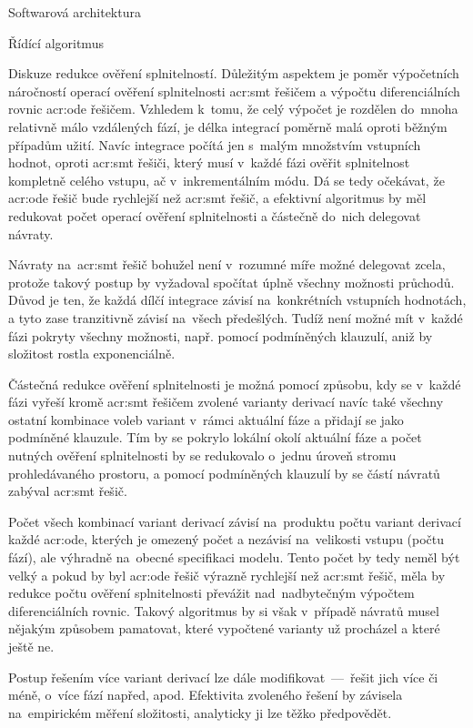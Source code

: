 \documentclass[thesis=M,czech]{FITthesis}[2012/06/26]
\newcommand{\acrlabel}[1]{acr:#1}
\newcommand{\acr}[1]{\acrshort{\acrlabel{#1}}}
\begin{document}
\begin{section}{Softwarová architektura}
\begin{subsection}{Řídící algoritmus}
\begin{paragraph}{Diskuze redukce ověření splnitelností.}
\label{ss:design:arch:alg:discuss}
Důležitým aspektem je poměr výpočetních náročností
operací ověření splnitelnosti \acr{smt} řešičem
a výpočtu diferenciálních rovnic \acr{ode} řešičem.
Vzhledem k~tomu, že celý výpočet je rozdělen
do~mnoha relativně málo vzdálených fází,
je délka integrací poměrně malá
oproti běžným případům užití.
Navíc integrace počítá jen s~malým množstvím
vstupních hodnot,
oproti \acr{smt} řešiči,
který musí v~každé fázi ověřit splnitelnost kompletně celého vstupu,
ač v~inkrementálním módu.
Dá se tedy očekávat,
že \acr{ode} řešič bude rychlejší než \acr{smt} řešič,
a efektivní algoritmus by měl redukovat
počet operací ověření splnitelnosti
a částečně do~nich delegovat návraty.

Návraty na~\acr{smt} řešič bohužel není v~rozumné míře
možné delegovat zcela,
protože takový postup by vyžadoval
spočítat úplně všechny možnosti průchodů.
Důvod je ten, že každá dílčí integrace závisí
na~konkrétních vstupních hodnotách,
a tyto zase tranzitivně závisí
na~všech předešlých.
Tudíž není možné mít v~každé fázi
pokryty všechny možnosti,
např. pomocí podmíněných klauzulí,
aniž by složitost rostla exponenciálně.

Částečná redukce ověření splnitelnosti
je možná pomocí způsobu,
kdy se v~každé fázi vyřeší
kromě \acr{smt} řešičem zvolené varianty derivací
navíc také všechny ostatní kombinace voleb variant
v~rámci aktuální fáze
a přidají se jako podmíněné klauzule.
Tím by se pokrylo lokální okolí aktuální fáze
a počet nutných ověření splnitelnosti
by se redukovalo o~jednu úroveň stromu prohledávaného prostoru,
a pomocí podmíněných klauzulí by se částí návratů zabýval \acr{smt} řešič.

Počet všech kombinací variant derivací
závisí na~produktu počtu variant derivací každé \acr{ode},
kterých je omezený počet a nezávisí na~velikosti vstupu (počtu fází),
ale výhradně na~obecné specifikaci modelu.
Tento počet by tedy neměl být velký
a pokud by byl \acr{ode} řešič výrazně rychlejší
než \acr{smt} řešič,
měla by redukce počtu ověření splnitelnosti
převážit nad~nadbytečným výpočtem diferenciálních rovnic.
Takový algoritmus by si však v~případě návratů
musel nějakým způsobem pamatovat,
které vypočtené varianty už procházel a které ještě ne.

Postup řešením více variant derivací
lze dále modifikovat~---~řešit jich více či méně,
o~více fází napřed, apod.
Efektivita zvoleného řešení by závisela
na~empirickém měření složitosti,
analyticky ji lze těžko předpovědět.
\end{paragraph} %


\end{subsection}
\end{section}
\end{document}

